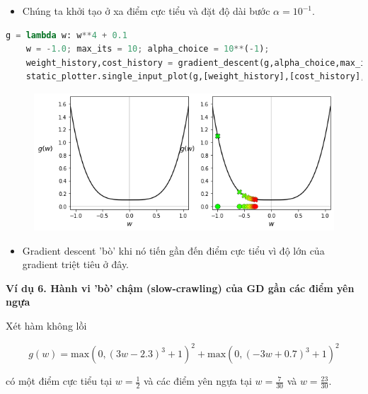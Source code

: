 \documentclass{book}
\begin{document}
\begin{itemize}
    \item Chúng ta khởi tạo ở xa điểm cực tiểu và đặt độ dài bước $\alpha=10^{-1}$.
\end{itemize}
\begin{lstlisting}[language=python]
    g = lambda w: w**4 + 0.1
    w = -1.0; max_its = 10; alpha_choice = 10**(-1);
    weight_history,cost_history = gradient_descent(g,alpha_choice,max_its,w)
    static_plotter.single_input_plot(g,[weight_history],[cost_history],wmin = -1.1,wmax = 1.1)
\end{lstlisting}
\begin{figure}[H]
    \centering
    \includegraphics[width=\textwidth]{images/slow_crawling_behaviour_minimum_point.png}
\end{figure}
\begin{itemize}
    \item Gradient descent 'bò' khi nó tiến gần đến điểm cực tiểu vì độ lớn của gradient triệt tiêu ở đây.
\end{itemize}
\textbf{Ví dụ 6. Hành vi 'bò' chậm (slow-crawling) của GD gần các điểm yên ngựa}

Xét hàm không lồi

\begin{equation*}
    g(w) = \text{max}(0,(3w - 2.3)^3 + 1)^2 + \text{max}(0,(-3w + 0.7)^3 + 1)^2
\end{equation*}

có một điểm cực tiểu tại $w= \frac{1}{2}$ và các điểm yên ngựa tại $w = \frac{7}{30}$ và $w = \frac{23}{30}$.
\end{document}
